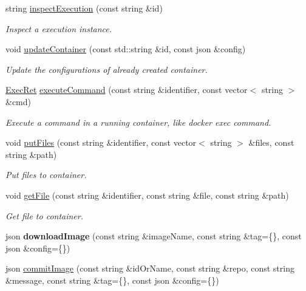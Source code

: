 \begin{DoxyCompactItemize}
string \mbox{\hyperlink{classDockerClientpp_1_1DockerClient_a77024e1f13419032edb0231008afe9db}{inspect\+Execution}} (const string \&id)
\begin{DoxyCompactList}\small\item\em Inspect a execution instance. \end{DoxyCompactList}\item 
void \mbox{\hyperlink{classDockerClientpp_1_1DockerClient_a402bac91e8a77c25f6c2159860844b71}{update\+Container}} (const std\+::string \&id, const json \&config)
\begin{DoxyCompactList}\small\item\em Update the configurations of already created container. \end{DoxyCompactList}\item 
\mbox{\hyperlink{structDockerClientpp_1_1ExecRet}{Exec\+Ret}} \mbox{\hyperlink{classDockerClientpp_1_1DockerClient_af7874a9609cfa0b4eccbbbfe0aeb793d}{execute\+Command}} (const string \&identifier, const vector$<$ string $>$ \&cmd)
\begin{DoxyCompactList}\small\item\em Execute a command in a running container, like {\ttfamily docker exec} command. \end{DoxyCompactList}\item 
void \mbox{\hyperlink{classDockerClientpp_1_1DockerClient_a11405765e25061de32ad62413fac39b6}{put\+Files}} (const string \&identifier, const vector$<$ string $>$ \&files, const string \&path)
\begin{DoxyCompactList}\small\item\em Put files to container. \end{DoxyCompactList}\item 
void \mbox{\hyperlink{classDockerClientpp_1_1DockerClient_a4865724c738b0454243b218fe2f72af8}{get\+File}} (const string \&identifier, const string \&file, const string \&path)
\begin{DoxyCompactList}\small\item\em Get file to container. \end{DoxyCompactList}\item 
\mbox{\label{classDockerClientpp_1_1DockerClient_a8d05d5d85c72d6dcd3e9aa6091159c42}} 
json {\bfseries download\+Image} (const string \&image\+Name, const string \&tag=\{\}, const json \&config=\{\})
\item 
json \mbox{\hyperlink{classDockerClientpp_1_1DockerClient_a2d65a1d1dca58bc44fb6034925fa8ad2}{commit\+Image}} (const string \&id\+Or\+Name, const string \&repo, const string \&message, const string \&tag=\{\}, const json \&config=\{\})

\end{DoxyCompactItemize}

